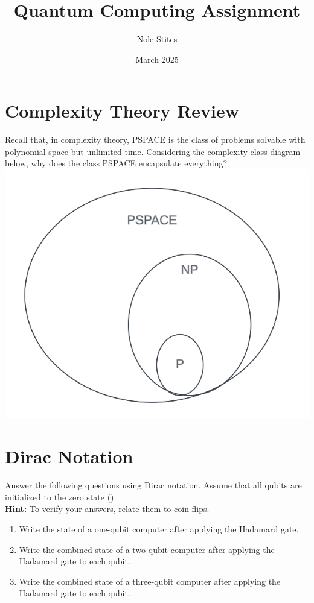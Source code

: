 \documentclass[12pt]{article}
\title{Quantum Computing Assignment}
\author{Nole Stites}
\date{March 2025}
\begin{document}
\maketitle

\section{Complexity Theory Review}
Recall that, in complexity theory, PSPACE is the class of problems solvable with polynomial space but unlimited time. Considering the complexity class diagram below, why does the class PSPACE encapsulate everything?
\includegraphics[]{p_np_pspace_diagram.png}

\section{Dirac Notation}
Answer the following questions using Dirac notation. Assume that all qubits are initialized to the zero state (). \\
\textbf{Hint:} To verify your answers, relate them to coin flips.

\begin{enumerate}[label=\alph*)]
    \item Write the state of a one-qubit computer after applying the Hadamard gate.
    \item Write the combined state of a two-qubit computer after applying the Hadamard gate to each qubit.
    \item Write the combined state of a three-qubit computer after applying the Hadamard gate to each qubit.
\end{enumerate}
\end{document}

